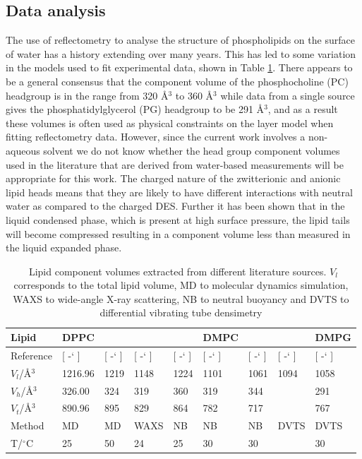 \documentclass[twoside,twocolumn,9pt]{article}
\newcommand*{\citen}[1]{%
	\begingroup
	\romannumeral-`\x %
	\setcitestyle{numbers}%
	\cite{#1}%
	\endgroup   
}
\begin{document}
\subsection{Data analysis}
The use of reflectometry to analyse the structure of phospholipids on the surface of water has a history extending over many years.\cite{Mohwald1990,Kewalramani2010,Bayerl1990,Johnson1991,Clifton2012,Helm1987,Daillant1990,Campbell2018} This has led to some variation in the models used to fit experimental data, shown in Table \ref{tab:water}. There appears to be a general consensus that the component volume of the phosphocholine (PC) headgroup is in the range from 320 \AA$^3$ to 360 \AA$^3$ while data from a single source gives the phosphatidylglycerol (PG) headgroup to be 291 \AA$^3$, and as a result these volumes is often used as physical constraints on the layer model when fitting reflectometry data. However, since the current work involves a non-aqueous solvent we do not know whether the head group component volumes used in the literature that are derived from water-based measurements will be appropriate for this work. The charged nature of the zwitterionic and anionic lipid heads means that they are likely to have different interactions with neutral water as compared to the charged DES.\cite{Sanchez-Fernandez2018} Further it has been shown that in the liquid condensed phase, which is present at high surface pressure, the lipid tails will become compressed resulting in a component volume less than measured in the liquid expanded phase.\cite{Campbell2018}

\begin{table}
	\small
	\caption{\ Lipid component volumes extracted from different literature sources. $V_l$ corresponds to the total lipid volume, MD to molecular dynamics simulation, WAXS to wide-angle X-ray scattering, NB to neutral buoyancy and DVTS to differential vibrating tube densimetry}
	\label{tab:water}
	\begin{tabular*}{\textwidth}{@{\extracolsep{\fill}}lllllllll}
		\hline 
		Lipid & DPPC & & & & DMPC & & & DMPG \\
		\hline
		Reference & [\citen{Armen1998}] & [\citen{Petrache1997}] & [\citen{Sun1994}] & [\citen{Tardieu1973}] & [\citen{Kucerka2004}] & [\citen{Nagle1978}] & [\citen{Schmidt1985}] & [\citen{Pan2012}] \\
		$V_l$/\AA$^3$ &1216.96 & 1219 & 1148 & 1224 & 1101 & 1061 & 1094 & 1058 \\
		$V_h$/\AA$^3$ & 326.00 & 324 & 319 & 360 & 319 & 344 & & 291 \\
		$V_t$/\AA$^3$ & 890.96 & 895 & 829 & 864 & 782 & 717 & & 767 \\
		Method & MD & MD & WAXS & NB & NB & NB & DVTS & DVTS \\
		T/$^\circ$C & 25 & 50 & 24 & 25 & 30 & 30 & & 30 \\
		\hline
	\end{tabular*}
\end{table}
\end{document}
